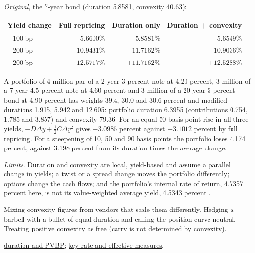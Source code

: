 \begin{qfmethod}
\emph{Original}, the 7-year bond (duration 5.8581, convexity 40.63):
\begin{center}\small
\begin{tabular}{@{}lrrr@{}}
\toprule
Yield change & Full repricing & Duration only & Duration + convexity \\
\midrule
+100 bp & $-5.6600\%$ & $-5.8581\%$ & $-5.6549\%$ \\
+200 bp & $-10.9431\%$ & $-11.7162\%$ & $-10.9036\%$ \\
$-200$ bp & $+12.5717\%$ & $+11.7162\%$ & $+12.5288\%$ \\
\bottomrule
\end{tabular}
\end{center}
A portfolio of 4 million par of a 2-year 3 percent note at 4.20 percent, 3 million of a 7-year 4.5 percent note at 4.60 percent and 3 million of a 20-year 5 percent bond at 4.90 percent has weights 39.4, 30.0 and 30.6 percent and modified durations 1.915, 5.942 and 12.605: portfolio duration 6.3955 (contributions 0.754, 1.785 and 3.857) and convexity 79.36. For an equal 50 basis point rise in all three yields, $-D\Delta y+\tfrac12C\Delta y^2$ gives $-3.0985$ percent against $-3.1012$ percent by full repricing. For a steepening of 10, 50 and 90 basis points the portfolio loses 4.174 percent, against 3.198 percent from its duration times the average change.

 \emph{Limits.} Duration and convexity are local, yield-based and assume a parallel change in yields; a twist or a spread change moves the portfolio differently; options change the cash flows; and the portfolio's internal rate of return, 4.7357 percent here, is not its value-weighted average yield, 4.5343 percent \citep[chap.~4, pp.~84--85]{s7-fabozzifixed}.

 Mixing convexity figures from vendors that scale them differently. Hedging a barbell with a bullet of equal duration and calling the position curve-neutral. Treating positive convexity as free (\hyperref[mod:duration-convexity]{carry is not determined by convexity}).

 \hyperref[meth:yield-duration-pvbp]{duration and PVBP}; \hyperref[meth:curve-based-empirical-duration]{key-rate and effective measures}.

\end{qfmethod}

